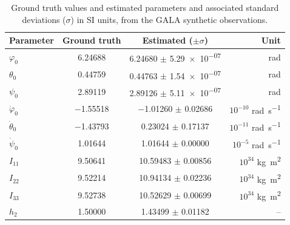 \documentclass[lineno, pdflatex,sn-mathphys-ay]{sn-jnl}
\theoremstyle{thmstyleone}%
\theoremstyle{thmstyletwo}%
\theoremstyle{thmstylethree}%
\let\unit\si
\begin{document}
\begin{table}
\centering
\caption{Ground truth values and estimated parameters and associated standard deviations ($\sigma$) in SI units, from the GALA synthetic observations.}
\label{tab:GALA_ground_truth_estimates}
\begin{tabular}{l c c r}
\hline \hline
Parameter & Ground truth & Estimated ($\pm \sigma$) & Unit \\
\hline
$\varphi_0$ & \num{6.24688} & \num{6.24680} $\pm$ \num{5.29e-07} & \unit{rad} \\
 $\theta_0$ & \num{0.44759} & \num{0.44763} $\pm$ \num{1.54e-07} & \unit{rad} \\
  $\psi_0$ & \num{2.89119} & \num{2.89126} $\pm$ \num{5.11e-07} & \unit{rad} \\ 
  $\dot{\varphi}_0$ & \num{-1.55518} & \num{-1.01260} $\pm$ \num{0.02686} & $10^{-10}$ \unit{rad.s^{-1}} \\
   $\dot{\theta}_0$ & \num{-1.43793} & \num{0.23024} $\pm$ \num{0.17137} & $10^{-11}$ \unit{rad.s^{-1}} \\ 
   $\dot{\psi}_0$ & \num{1.01644} & \num{1.01644} $\pm$ \num{0.00000} & $10^{-5}$ \unit{rad.s^{-1}} \\
    $I_{11}$ & \num{9.50641} & \num{10.59483} $\pm$ \num{0.00856} & $10^{34}$ \unit{kg.m^2} \\
	 $I_{22}$ & \num{9.52214} & \num{10.94134} $\pm$ \num{0.02236} & $10^{34}$ \unit{kg.m^2} \\
	  $I_{33}$ & \num{9.52738} & \num{10.52629} $\pm$ \num{0.00699} & $10^{34}$ \unit{kg.m^2} \\ 
	    $h_2$ & \num{1.50000} & \num{1.43499} $\pm$ \num{0.01182} & -- \\

\end{tabular}
\end{table}
\end{document}
